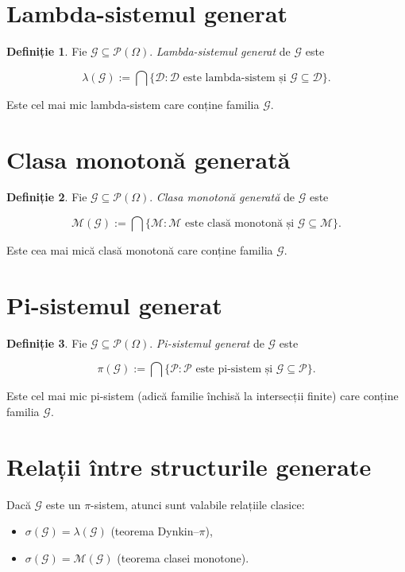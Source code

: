 \documentclass[12pt]{article}
\theoremstyle{definition}
\newtheorem{definition}{Definiție}
\begin{document}
\section{Lambda-sistemul generat}

\begin{definition}
Fie $\mathcal{G} \subseteq \mathcal{P}(\Omega)$. \emph{Lambda-sistemul generat} de $\mathcal{G}$ este


\[
    \lambda(\mathcal{G})
    :=
    \bigcap \{\mathcal{D} : \mathcal{D} \text{ este lambda-sistem și } \mathcal{G} \subseteq \mathcal{D}\}.
\]


Este cel mai mic lambda-sistem care conține familia $\mathcal{G}$.
\end{definition}

\section{Clasa monotonă generată}

\begin{definition}
Fie $\mathcal{G} \subseteq \mathcal{P}(\Omega)$. \emph{Clasa monotonă generată} de $\mathcal{G}$ este


\[
    \mathcal{M}(\mathcal{G})
    :=
    \bigcap \{\mathcal{M} : \mathcal{M} \text{ este clasă monotonă și } \mathcal{G} \subseteq \mathcal{M}\}.
\]


Este cea mai mică clasă monotonă care conține familia $\mathcal{G}$.
\end{definition}

\section{Pi-sistemul generat}

\begin{definition}
Fie $\mathcal{G} \subseteq \mathcal{P}(\Omega)$. \emph{Pi-sistemul generat} de $\mathcal{G}$ este


\[
    \pi(\mathcal{G})
    :=
    \bigcap \{\mathcal{P} : \mathcal{P} \text{ este pi-sistem și } \mathcal{G} \subseteq \mathcal{P}\}.
\]


Este cel mai mic pi-sistem (adică familie închisă la intersecții finite) care conține familia $\mathcal{G}$.
\end{definition}

\section{Relații între structurile generate}

\noindent
Dacă $\mathcal{G}$ este un $\pi$-sistem, atunci sunt valabile relațiile clasice:
\begin{itemize}
    \item $\sigma(\mathcal{G}) = \lambda(\mathcal{G})$ (teorema Dynkin--$\pi$),
    \item $\sigma(\mathcal{G}) = \mathcal{M}(\mathcal{G})$ (teorema clasei monotone).
\end{itemize}
\end{document}
